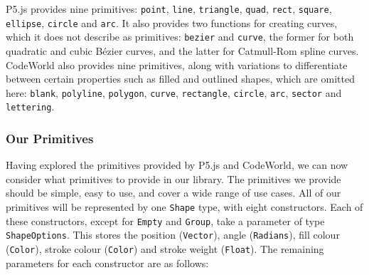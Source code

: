\documentclass[../main.tex]{subfiles}
\begin{document}
                P5.js provides nine primitives: \texttt{point}, \texttt{line},
                    \texttt{triangle}, \texttt{quad}, \texttt{rect}, \texttt{square},
                    \texttt{ellipse}, \texttt{circle} and \texttt{arc}.
                It also provides two functions for creating curves, which it does not describe
                    as primitives: \texttt{bezier} and \texttt{curve}, the former for both
                    quadratic and cubic Bézier curves, and the latter for Catmull-Rom spline
                    curves.
                CodeWorld also provides nine primitives, along with variations to differentiate
                    between certain properties such as filled and outlined shapes, which are
                    omitted here: \texttt{blank}, \texttt{polyline}, \texttt{polygon},
                    \texttt{curve}, \texttt{rectangle}, \texttt{circle}, \texttt{arc},
                    \texttt{sector} and \texttt{lettering}.

            \subsubsection{Our Primitives}
                Having explored the primitives provided by P5.js and CodeWorld, we can now
                    consider what primitives to provide in our library.
                The primitives we provide should be simple, easy to use, and cover a wide range
                    of use cases.
                All of our primitives will be represented by one \texttt{Shape} type, with
                    eight constructors.
                Each of these constructors, except for \texttt{Empty} and \texttt{Group}, take
                    a parameter of type \texttt{ShapeOptions}.
                This stores the position (\texttt{Vector}), angle (\texttt{Radians}), fill
                    colour (\texttt{Color}), stroke colour (\texttt{Color}) and stroke weight
                    (\texttt{Float}).
                The remaining parameters for each constructor are as follows:
\end{document}
